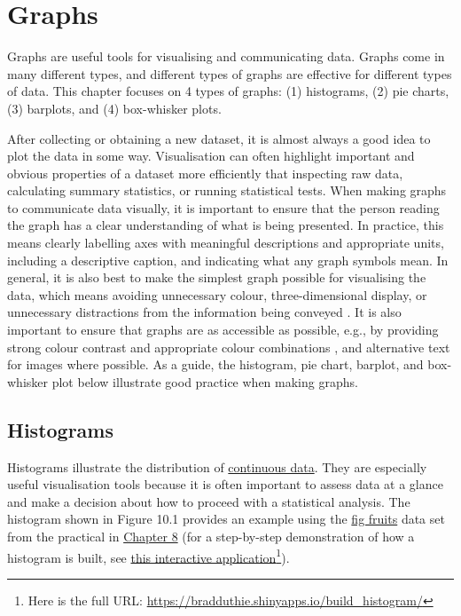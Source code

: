 \documentclass[
]{scrbook}
\begin{document}
\hypertarget{Chapter_10}{%
\chapter{Graphs}\label{Chapter_10}}

Graphs are useful tools for visualising and communicating data.
Graphs come in many different types, and different types of graphs are effective for different types of data.
This chapter focuses on 4 types of graphs: (1) histograms, (2) pie charts, (3) barplots, and (4) box-whisker plots.

After collecting or obtaining a new dataset, it is almost always a good idea to plot the data in some way.
Visualisation can often highlight important and obvious properties of a dataset more efficiently that inspecting raw data, calculating summary statistics, or running statistical tests.
When making graphs to communicate data visually, it is important to ensure that the person reading the graph has a clear understanding of what is being presented.
In practice, this means clearly labelling axes with meaningful descriptions and appropriate units, including a descriptive caption, and indicating what any graph symbols mean.
In general, it is also best to make the simplest graph possible for visualising the data, which means avoiding unnecessary colour, three-dimensional display, or unnecessary distractions from the information being conveyed \citep{Dytham2011, Kelleher2011}.
It is also important to ensure that graphs are as accessible as possible, e.g., by providing strong colour contrast and appropriate colour combinations \citep{Elavsky2022}, and alternative text for images where possible.
As a guide, the histogram, pie chart, barplot, and box-whisker plot below illustrate good practice when making graphs.

\hypertarget{histograms}{%
\section{Histograms}\label{histograms}}

Histograms illustrate the distribution of \protect\hyperlink{Chapter_5}{continuous data}.
They are especially useful visualisation tools because it is often important to assess data at a glance and make a decision about how to proceed with a statistical analysis.
The histogram shown in Figure 10.1 provides an example using the \href{https://raw.githubusercontent.com/bradduthie/SCIU4T4/main/data/fig_fruits.csv}{fig fruits} data set from the practical in \protect\hyperlink{Chapter_8}{Chapter 8} (for a step-by-step demonstration of how a histogram is built, see \href{https://bradduthie.shinyapps.io/build_histogram/}{this interactive application}\footnote{Here is the full URL: \url{https://bradduthie.shinyapps.io/build_histogram/}}).
\end{document}
